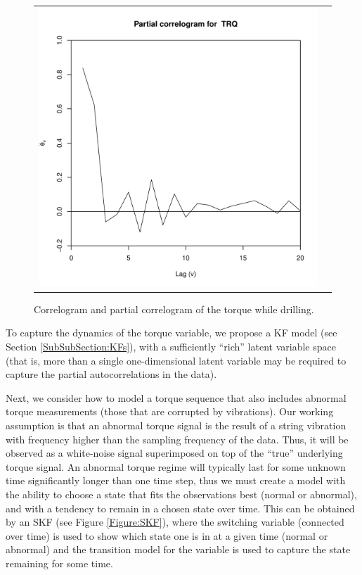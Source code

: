 \begin{figure}[ht!]
\begin{center}
\begin{tabular}{c@{}c}
\includegraphics[scale=0.4]{./figures/Verdande_ParCorr_TRQ.pdf}  \\
\end{tabular}
\caption{\label{Figure:VTTorqueAutoCorr} Correlogram and partial correlogram of the torque while drilling.}
\end{center}
\end{figure}

To capture the dynamics of the torque variable, we propose a KF model (see Section \ref{SubSubSection:KFs}), with a sufficiently ``rich'' latent variable space (that is, more than a single one-dimensional latent variable may be required to capture the partial autocorrelations in the data). 

Next, we consider how to model a torque sequence that also includes abnormal torque measurements (those that are corrupted by vibrations). Our working assumption is that an abnormal torque signal is the result of a string vibration with frequency higher than the sampling frequency of the data. Thus, it will be observed as a white-noise signal superimposed on top of the ``true'' underlying torque signal. An abnormal torque regime will typically last for some unknown time significantly longer than one time step, thus we must create a model with the ability to choose a state that fits the observations best (normal or abnormal), and with a tendency to remain in a chosen state over time. This can be obtained by an SKF (see Figure \ref{Figure:SKF}), where the switching variable (connected over time) is used to show which state one is in at a given time (normal or abnormal) and the transition model for the variable is used to capture the state remaining for some time. 

